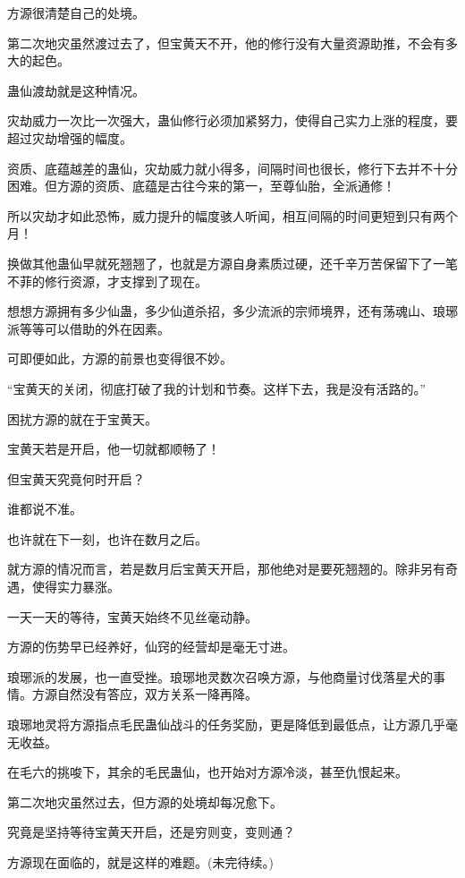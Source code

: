 \begin{this_body}
方源很清楚自己的处境。

第二次地灾虽然渡过去了，但宝黄天不开，他的修行没有大量资源助推，不会有多大的起色。

蛊仙渡劫就是这种情况。

灾劫威力一次比一次强大，蛊仙修行必须加紧努力，使得自己实力上涨的程度，要超过灾劫增强的幅度。

资质、底蕴越差的蛊仙，灾劫威力就小得多，间隔时间也很长，修行下去并不十分困难。但方源的资质、底蕴是古往今来的第一，至尊仙胎，全派通修！

所以灾劫才如此恐怖，威力提升的幅度骇人听闻，相互间隔的时间更短到只有两个月！

换做其他蛊仙早就死翘翘了，也就是方源自身素质过硬，还千辛万苦保留下了一笔不菲的修行资源，才支撑到了现在。

想想方源拥有多少仙蛊，多少仙道杀招，多少流派的宗师境界，还有荡魂山、琅琊派等等可以借助的外在因素。

可即便如此，方源的前景也变得很不妙。

“宝黄天的关闭，彻底打破了我的计划和节奏。这样下去，我是没有活路的。”

困扰方源的就在于宝黄天。

宝黄天若是开启，他一切就都顺畅了！

但宝黄天究竟何时开启？

谁都说不准。

也许就在下一刻，也许在数月之后。

就方源的情况而言，若是数月后宝黄天开启，那他绝对是要死翘翘的。除非另有奇遇，使得实力暴涨。

一天一天的等待，宝黄天始终不见丝毫动静。

方源的伤势早已经养好，仙窍的经营却是毫无寸进。

琅琊派的发展，也一直受挫。琅琊地灵数次召唤方源，与他商量讨伐落星犬的事情。方源自然没有答应，双方关系一降再降。

琅琊地灵将方源指点毛民蛊仙战斗的任务奖励，更是降低到最低点，让方源几乎毫无收益。

在毛六的挑唆下，其余的毛民蛊仙，也开始对方源冷淡，甚至仇恨起来。

第二次地灾虽然过去，但方源的处境却每况愈下。

究竟是坚持等待宝黄天开启，还是穷则变，变则通？

方源现在面临的，就是这样的难题。(未完待续。)

\end{this_body}

